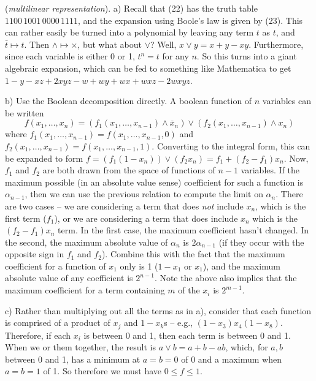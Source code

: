\vskip 0.1in  ({\it multilinear representation}).\hfil\break
a) Recall that (22) has the truth table $1100\,1001\,0000\,1111$, and
the expansion using Boole's law is given by (23).  This can rather easily
be turned into a polynomial by leaving any term $t$ as $t$, and
$\bar t \mapsto t$.  Then $\land \mapsto \times$, but what about $\vee$?
Well, $x \vee y = x + y - x y$.  Furthermore, since each variable is either
0 or 1, $t^n = t$ for any $n$.  So this turns into a giant algebraic expansion,
which can be fed to something like Mathematica to get $1 - y - x z + 2 x y z - w +
wy + wx + wxz - 2 w x y z$.

\vskip 0.05in
\noindent b) Use the Boolean decomposition directly.  A boolean function of $n$ 
variables can be written 
$$f\left(x_1, \ldots, x_n\right) = \left(f_1 \left(x_1, \ldots, x_{n-1}\right)
\land {\bar x_n}\right) \vee \left(f_2 \left(x_1, \ldots, x_{n-1}\right)
\land x_n\right)
$$ 
where $f_1\left(x_1, \ldots, x_{n-1}\right) =
f\left(x_1, \ldots, x_{n-1}, 0\right)$ and $f_2\left(x_1, \ldots, x_{n-1}\right) =
f\left(x_1, \ldots, x_{n-1}, 1\right)$.  Converting to the integral form,
this can be expanded to form $f = \left(f_1 \left(1 - x_n\right)\right) \vee
\left(f_2 x_n\right) = f_1 + \left(f_2 - f_1\right) x_n$.  Now,
$f_1$ and $f_2$ are both drawn from the space of functions of $n-1$ variables.
If the maximum possible (in an absolute value sense) coefficient 
for such a function is $\alpha_{n-1}$, then we can use the previous relation
to compute the limit on $\alpha_n$.  There are two cases -- we are
considering a term that does {\it not} include $x_n$, which is the first
term ($f_1$), or we are considering a term that does include $x_n$ which is
the $\left(f_2 - f_1\right) x_n$ term.  In the first case, the maximum coefficient
hasn't changed.  In the second, the maximum absolute value of $\alpha_n$
is $2 \alpha_{n-1}$ (if they occur with the opposite sign in $f_1$ and $f_2$).
Combine this with the fact that the maximum coefficient for a function of $x_1$
only is 1 ($1 - x_1$ or $x_1$), and the maximum absolute value of any coefficient 
is $2^{n-1}$.  Note the above also implies that the maximum coefficient for
a term containing $m$ of the $x_i$ is $2^{m-1}$.

\vskip 0.05in
\noindent c) Rather than multiplying out all the terms as in a), consider
that each function is comprised of a product of $x_j$ and $1 - x_k$s --
e.g., $\left(1 - x_3\right) x_4 \left(1 - x_8\right)$.  Therefore, if each $x_i$
is between 0 and 1, then each term is between 0 and 1.  When we or
them together, the result is $a \vee b = a + b - a b$, which, for
$a, b$ between 0 and 1, has a minimum at $a = b = 0$ of 0 and a maximum
when $a = b = 1$ of 1.  So therefore we must have $0 \leq f \leq 1$.

